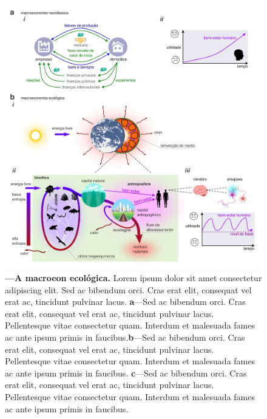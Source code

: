 \documentclass[./main.tex]{subfiles}
\begin{document}
\begin{figure}[t!] 
\centering				
\includegraphics[width=0.98\linewidth]{figs/fig_ecomodel.jpg}		
\caption[A \gls{macroeon} Ecológica]
{\textbf{---\;A \gls{macroeon} ecológica.}
    Lorem ipsum dolor sit amet consectetur adipiscing elit. Sed ac bibendum orci. Cras erat elit, consequat vel erat ac, tincidunt pulvinar lacus. \;\textbf{a}\;---\;Sed ac bibendum orci. Cras erat elit, consequat vel erat ac, tincidunt pulvinar lacus. Pellentesque vitae consectetur quam. Interdum et malesuada fames ac ante ipsum primis in faucibus.\;\textbf{b}\;---\;Sed ac bibendum orci. Cras erat elit, consequat vel erat ac, tincidunt pulvinar lacus. Pellentesque vitae consectetur quam. Interdum et malesuada fames ac ante ipsum primis in faucibus. \;\textbf{c}\;---\;Sed ac bibendum orci. Cras erat elit, consequat vel erat ac, tincidunt pulvinar lacus. Pellentesque vitae consectetur quam. Interdum et malesuada fames ac ante ipsum primis in faucibus.
}
\label{fig:eco:ecomodel} 		
\end{figure}
\end{document}
